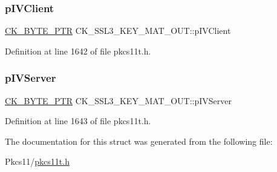 \subsubsection{\texorpdfstring{p\+I\+V\+Client}{pIVClient}}
{\footnotesize\ttfamily \hyperlink{pkcs11t_8h_a3d7233a4077fbaf7ae76b64da0a62a21}{C\+K\+\_\+\+B\+Y\+T\+E\+\_\+\+P\+TR} C\+K\+\_\+\+S\+S\+L3\+\_\+\+K\+E\+Y\+\_\+\+M\+A\+T\+\_\+\+O\+U\+T\+::p\+I\+V\+Client}



Definition at line 1642 of file pkcs11t.\+h.

\mbox{\label{struct_c_k___s_s_l3___k_e_y___m_a_t___o_u_t_aab8e3a04c7ababeaf39ae5692a6c4178}} 
\subsubsection{\texorpdfstring{p\+I\+V\+Server}{pIVServer}}
{\footnotesize\ttfamily \hyperlink{pkcs11t_8h_a3d7233a4077fbaf7ae76b64da0a62a21}{C\+K\+\_\+\+B\+Y\+T\+E\+\_\+\+P\+TR} C\+K\+\_\+\+S\+S\+L3\+\_\+\+K\+E\+Y\+\_\+\+M\+A\+T\+\_\+\+O\+U\+T\+::p\+I\+V\+Server}



Definition at line 1643 of file pkcs11t.\+h.



The documentation for this struct was generated from the following file\+:\begin{DoxyCompactItemize}
\item 
Pkcs11/\hyperlink{pkcs11t_8h}{pkcs11t.\+h}\end{DoxyCompactItemize}
